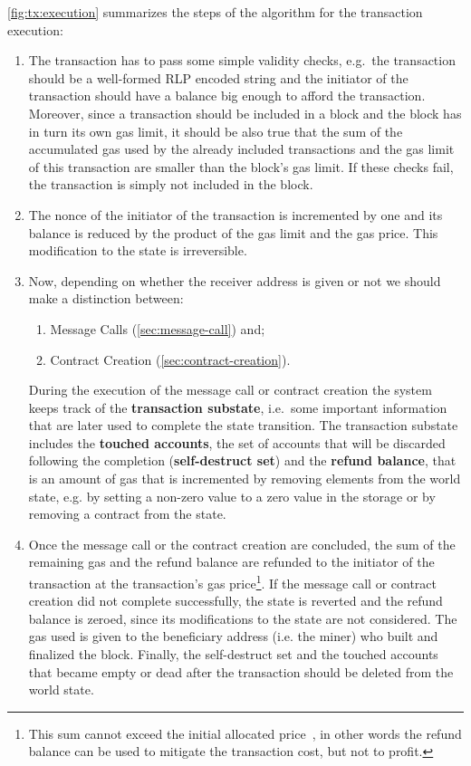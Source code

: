 \autoref{fig:tx:execution} summarizes the steps of the algorithm for the
transaction execution:
\begin{enumerate}
	\item The transaction has to pass some simple validity checks, e.g.\ the
	transaction should be a well-formed RLP encoded string and the initiator of
	the transaction should have a balance big enough to afford the transaction.
	Moreover, since a transaction should be included in a block and the block has
	in turn its own gas limit, it should be also true that the sum of the
	accumulated gas used by the already included transactions and the gas limit of
	this transaction are smaller than the block's gas limit. If these checks fail,
	the transaction is simply not included in the block.
	\item The nonce of the initiator of the transaction is incremented by one and
	its balance is reduced by the product of the gas limit and the gas price. This
	modification to the state is irreversible.
	\item Now, depending on whether the receiver address is given or not we should
	make a distinction between:
	\begin{enumerate}[label=\alph*.]
		\item Message Calls (\autoref{sec:message-call}) and;
		\item Contract Creation (\autoref{sec:contract-creation}).
	\end{enumerate}
	During the execution of the message call or contract creation the system keeps
	track of the \textbf{transaction substate}, i.e.\ some important information
	that are later used to complete the state transition. The transaction substate
	includes the \textbf{touched accounts}, the set of accounts that will be
	discarded following the completion (\textbf{self-destruct set}) and the
	\textbf{refund balance}, that is an amount of gas that is incremented by
	removing elements from the world state, e.g. by setting a non-zero value to a
	zero value in the storage or by removing a contract from the state.
	\item Once the message call or the contract creation are concluded, the sum of
	the remaining gas and the refund balance are refunded to the initiator of the
	transaction at the transaction's gas price\footnote{This sum cannot exceed the
	initial allocated price~\cite{wood2018ethereum}, in other words the refund
	balance can be used to mitigate the transaction cost, but not to profit.}. If
	the message call or contract creation did not complete successfully, the
	state is reverted and the refund balance is zeroed, since its modifications to
	the state are not considered. The gas used is given to the beneficiary address
	(i.e. the miner) who built and finalized the block. Finally, the self-destruct
	set and the touched accounts that became empty or dead after the transaction
	should be deleted from the world state.
\end{enumerate}


